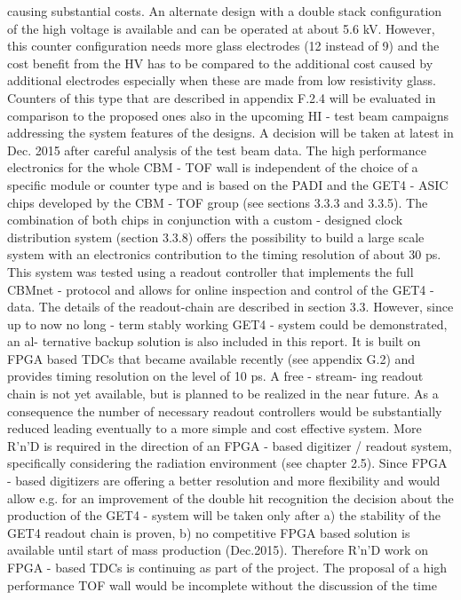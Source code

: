 causing substantial costs. An alternate design with a double stack configuration of the high voltage
is available and can be operated at about 5.6 kV. However, this counter configuration needs more
glass electrodes (12 instead of 9) and the cost benefit from the HV has to be compared to the
additional cost caused by additional electrodes especially when these are made from low resistivity
glass. Counters of this type that are described in appendix F.2.4 will be evaluated in comparison to
the proposed ones also in the upcoming HI - test beam campaigns addressing the system features of
the designs. A decision will be taken at latest in Dec. 2015 after careful analysis of the test beam
data.
The high performance electronics for the whole CBM - TOF wall is independent of the choice of a specific
module or counter type and is based on the PADI and the GET4 - ASIC chips developed by the CBM -
TOF group (see sections 3.3.3 and 3.3.5). The combination of both chips in conjunction with a custom -
designed clock distribution system (section 3.3.8) offers the possibility to build a large scale system with
an electronics contribution to the timing resolution of about 30 ps. This system was tested using a readout
controller that implements the full CBMnet - protocol and allows for online inspection and control of the
GET4 - data. The details of the readout-chain are described in section 3.3.
However, since up to now no long - term stably working GET4 - system could be demonstrated, an al-
ternative backup solution is also included in this report. It is built on FPGA based TDCs that became
available recently (see appendix G.2) and provides timing resolution on the level of 10 ps. A free - stream-
ing readout chain is not yet available, but is planned to be realized in the near future. As a consequence
the number of necessary readout controllers would be substantially reduced leading eventually to a more
simple and cost effective system. More R'n'D is required in the direction of an FPGA - based digitizer /
readout system, specifically considering the radiation environment (see chapter 2.5).
Since FPGA - based digitizers are offering a better resolution and more flexibility and would allow e.g.
for an improvement of the double hit recognition the decision about the production of the GET4 - system
will be taken only after a) the stability of the GET4 readout chain is proven, b) no competitive FPGA
based solution is available until start of mass production (Dec.2015). Therefore R'n'D work on FPGA -
based TDCs is continuing as part of the project.
The proposal of a high performance TOF wall would be incomplete without the discussion of the time
